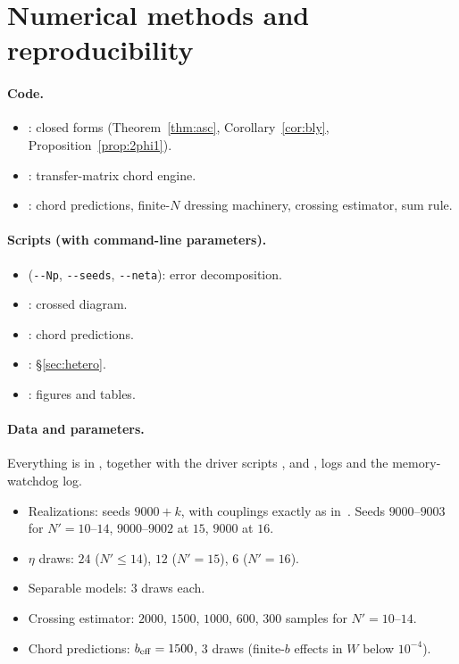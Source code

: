\documentclass[11pt]{article}
\newcommand{\Np}{N'}
\theoremstyle{plain}
\theoremstyle{remark}
\numberwithin{equation}{section}
\begin{document}
\section{Numerical methods and reproducibility}\label{app:repro}

\paragraph{Code.}
\begin{itemize}\itemsep1pt
\item {}: closed forms (Theorem~\ref{thm:asc}, Corollary~\ref{cor:bly},
  Proposition~\ref{prop:2phi1}).
\item {}: transfer-matrix chord engine.
\item {}: chord predictions, finite-$N$ dressing machinery, crossing estimator, sum rule.
\end{itemize}

\paragraph{Scripts (with command-line parameters).}
\begin{itemize}\itemsep1pt
\item {} (\texttt{-{}-Np}, \texttt{-{}-seeds}, \texttt{-{}-neta}): error decomposition.
\item {}: crossed diagram.
\item {}: chord predictions.
\item {}: \S\ref{sec:hetero}.
\item {}: figures and tables.
\end{itemize}

\paragraph{Data and parameters.} Everything is in , together with the
driver scripts ,  and , logs and the
memory-watchdog log.
\begin{itemize}\itemsep1pt
\item Realizations: seeds $9000+k$, with couplings exactly as in~\cite{prog1013}. Seeds $9000$--$9003$ for
  $\Np=10$--$14$, $9000$--$9002$ at $15$, $9000$ at $16$.
\item $\eta$ draws: $24$ ($\Np\le14$), $12$ ($\Np=15$), $6$ ($\Np=16$).
\item Separable models: $3$ draws each.
\item Crossing estimator: $2000$, $1500$, $1000$, $600$, $300$ samples for $\Np=10$--$14$.
\item Chord predictions: $b_{\rm eff}=1500$, $3$ draws (finite-$b$ effects in $W$ below $10^{-4}$).
\end{itemize}
\end{document}
